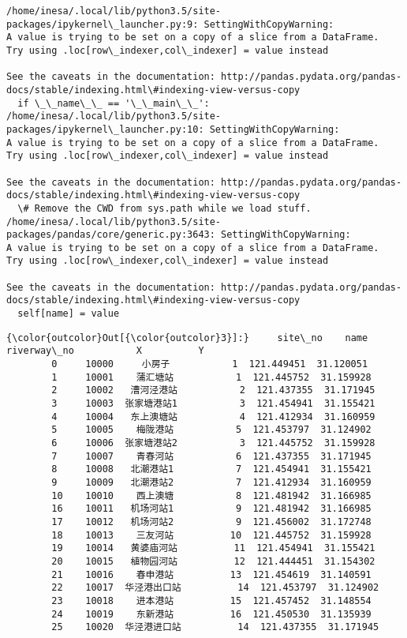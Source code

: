 \documentclass[11pt]{article}
\begin{document}
    \begin{Verbatim}[commandchars=\\\{\}]
/home/inesa/.local/lib/python3.5/site-packages/ipykernel\_launcher.py:9: SettingWithCopyWarning: 
A value is trying to be set on a copy of a slice from a DataFrame.
Try using .loc[row\_indexer,col\_indexer] = value instead

See the caveats in the documentation: http://pandas.pydata.org/pandas-docs/stable/indexing.html\#indexing-view-versus-copy
  if \_\_name\_\_ == '\_\_main\_\_':
/home/inesa/.local/lib/python3.5/site-packages/ipykernel\_launcher.py:10: SettingWithCopyWarning: 
A value is trying to be set on a copy of a slice from a DataFrame.
Try using .loc[row\_indexer,col\_indexer] = value instead

See the caveats in the documentation: http://pandas.pydata.org/pandas-docs/stable/indexing.html\#indexing-view-versus-copy
  \# Remove the CWD from sys.path while we load stuff.
/home/inesa/.local/lib/python3.5/site-packages/pandas/core/generic.py:3643: SettingWithCopyWarning: 
A value is trying to be set on a copy of a slice from a DataFrame.
Try using .loc[row\_indexer,col\_indexer] = value instead

See the caveats in the documentation: http://pandas.pydata.org/pandas-docs/stable/indexing.html\#indexing-view-versus-copy
  self[name] = value

    \end{Verbatim}

\begin{Verbatim}[commandchars=\\\{\}]
{\color{outcolor}Out[{\color{outcolor}3}]:}     site\_no    name riverway\_no           X          Y
        0     10000     小房子           1  121.449451  31.120051
        1     10001    蒲汇塘站           1  121.445752  31.159928
        2     10002   漕河泾港站           2  121.437355  31.171945
        3     10003  张家塘港站1           3  121.454941  31.155421
        4     10004   东上澳塘站           4  121.412934  31.160959
        5     10005    梅陇港站           5  121.453797  31.124902
        6     10006  张家塘港站2           3  121.445752  31.159928
        7     10007    青春河站           6  121.437355  31.171945
        8     10008   北潮港站1           7  121.454941  31.155421
        9     10009   北潮港站2           7  121.412934  31.160959
        10    10010    西上澳塘           8  121.481942  31.166985
        16    10011   机场河站1           9  121.481942  31.166985
        17    10012   机场河站2           9  121.456002  31.172748
        18    10013    三友河站          10  121.445752  31.159928
        19    10014   黄婆庙河站          11  121.454941  31.155421
        20    10015   植物园河站          12  121.444451  31.154302
        21    10016    春申港站          13  121.454619  31.140591
        22    10017  华泾港出口站          14  121.453797  31.124902
        23    10018    进本港站          15  121.457452  31.148554
        24    10019    东新港站          16  121.450530  31.135939
        25    10020  华泾港进口站          14  121.437355  31.171945
\end{Verbatim}
            
\end{document}
